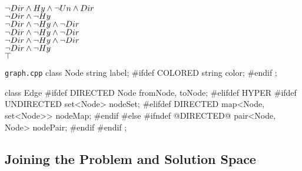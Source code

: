 \begin{frame}[fragile]{\myframetitle}
\begin{mycolumns}[t,columns=3,widths={40,23,37},animation=none]
{\begin{flushright}
				{\color{gray}$\neg Dir \wedge Hy \wedge \neg Un \wedge Dir$}\\
				{\color{green}$\neg Dir \wedge \neg Hy$}\\
				{\color{red}$\neg Dir \wedge \neg Hy \wedge \neg Dir$}\\
				{\color{red}$\neg Dir \wedge \neg Hy \wedge \neg Dir$}\\
				{\color{red}$\neg Dir \wedge \neg Hy \wedge \neg Dir$}\\
				{\color{green}$\neg Dir \wedge \neg Hy$}\\
				{\color{gray}$\top$}
			\end{flushright}
		}
	\mynextcolumn
		\begin{cpptight}[basicstyle=\small]{\texttt{graph.cpp}}
class Node {
	string label;
#ifdef COLORED
	string color;
#endif
};

class Edge {
#ifdef DIRECTED
	Node fromNode, toNode;
#elifdef HYPER
#ifdef UNDIRECTED
	set<Node> nodeSet;
#elifdef DIRECTED
	map<Node, set<Node>> nodeMap;
#endif
#else
#ifndef @DIRECTED@
	pair<Node, Node> nodePair;
#endif
#endif
};
		\end{cpptight}
	\end{mycolumns}
\end{frame}

\subsection{Joining the Problem and Solution Space}

